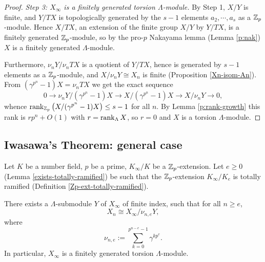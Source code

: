 \begin{proof}
\emph{Step 3: $X_\infty$ is a finitely generated torsion $\Lambda$-module.}
By Step 1, $X/Y$ is finite, and $Y/TX$ is topologically generated by the $s-1$
elements $a_2,\cdots,a_s$ as a ${\mathbb {Z}}_p$-module.
Hence $X/TX$, an extension of the finite group $X/Y$ by $Y/TX$, is a finitely
generated ${\mathbb {Z}}_p$-module, so by the pro-$p$ Nakayama lemma (Lemma \ref{p:nak})
$X$ is a finitely generated $\Lambda$-module.

Furthermore, $\nu_nY/\nu_nTX$ is a quotient of $Y/TX$, hence is generated by
$s-1$ elements as a ${\mathbb {Z}}_p$-module, and $X/\nu_nY\cong X_n$ is finite
(Proposition \ref{Xn-isom-An}).
From $(\gamma^{p^n}-1)X=\nu_nTX$ we get the exact sequence
$$0\to\nu_nY/(\gamma^{p^n}-1)X\to X/(\gamma^{p^n}-1)X\to X/\nu_nY\to 0,$$
whence $\operatorname{rank}_{{\mathbb {Z}}_p}\big(X/(\gamma^{p^n}-1)X\big)\leq s-1$ for all $n$.
By Lemma \ref{p:rank-growth} this rank is $rp^n+O(1)$ with
$r=\operatorname{rank}_\Lambda X$, so $r=0$ and $X$ is a torsion $\Lambda$-module.
\end{proof}

\subsection{Iwasawa's Theorem: general case}

Let $K$ be a number field, $p$ be a prime,
$K_\infty/K$ be a ${\mathbb {Z}}_p$-extension.
Let $e\geq 0$ (Lemma \ref{exists-totally-ramified})
be such that the ${\mathbb {Z}}_p$-extension $K_\infty/K_e$
is totally ramified (Definition \ref{Zp-ext-totally-ramified}).

\begin{thm}
\label{Xn-isom-qout}
There exists a $\Lambda$-submodule $Y$ of $X_\infty$ of finite index,
such that for all $n\geq e$,
$$
X_n\cong X_\infty/\nu_{n,e}Y,
$$
where
$$
\nu_{n,e}:=\sum_{k=0}^{p^{n-e}-1}\gamma^{kp^e}.
$$
In particular, $X_\infty$ is a finitely generated torsion $\Lambda$-module.
\end{thm}

